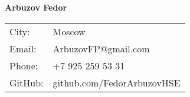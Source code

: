 \documentclass[a4paper,12pt]{article}
\begin{document}

\noindent \LARGE{\textbf{Arbuzov Fedor}} \\
\vspace{-2ex}
\hline
\normalsize


\begin{center}
\begin{tabular}{l l}
 City: & \hspace{0.8in} Moscow \\
 Email: & \hspace{0.8in} ArbuzovFP@gmail.com \\
 Phone: & \hspace{0.8in} +7 925 259 53 31 \\
 GitHub: & \hspace{0.8in} github.com/FedorArbuzovHSE \\
\end{tabular}
\end{center}

\vspace{1em}

\end{document}

